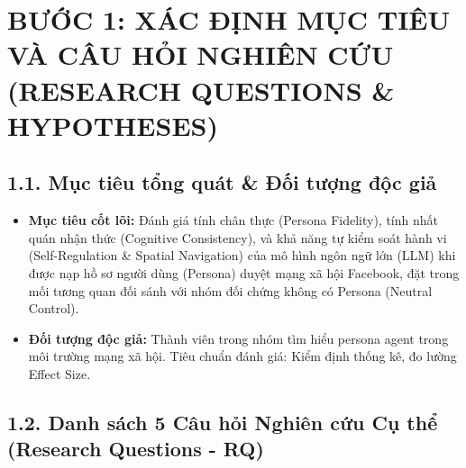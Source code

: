 \documentclass[11pt]{article}
\providecommand{\tightlist}{%
      \setlength{\itemsep}{0pt}\setlength{\parskip}{0pt}}
\begin{document}
    \section{BƯỚC 1: XÁC ĐỊNH MỤC TIÊU VÀ CÂU HỎI NGHIÊN CỨU (RESEARCH
QUESTIONS \&
HYPOTHESES)}\label{bux1b0ux1edbc-1-xuxe1c-ux111ux1ecbnh-mux1ee5c-tiuxeau-vuxe0-cuxe2u-hux1ecfi-nghiuxean-cux1ee9u-research-questions-hypotheses}

\subsection{1.1. Mục tiêu tổng quát \& Đối tượng độc
giả}\label{mux1ee5c-tiuxeau-tux1ed5ng-quuxe1t-ux111ux1ed1i-tux1b0ux1ee3ng-ux111ux1ed9c-giux1ea3}

\begin{itemize}
\tightlist
\item
  \textbf{Mục tiêu cốt lõi:} Đánh giá tính chân thực (Persona Fidelity),
  tính nhất quán nhận thức (Cognitive Consistency), và khả năng tự kiểm
  soát hành vi (Self-Regulation \& Spatial Navigation) của mô hình ngôn
  ngữ lớn (LLM) khi được nạp hồ sơ người dùng (Persona) duyệt mạng xã
  hội Facebook, đặt trong mối tương quan đối sánh với nhóm đối chứng
  không có Persona (Neutral Control).
\item
  \textbf{Đối tượng độc giả:} Thành viên trong nhóm tìm hiểu persona
  agent trong môi trường mạng xã hội. Tiêu chuẩn đánh giá: Kiểm định
  thống kê, đo lường Effect Size.
\end{itemize}

    \subsection{1.2. Danh sách 5 Câu hỏi Nghiên cứu Cụ thể (Research
Questions -
RQ)}\label{danh-suxe1ch-5-cuxe2u-hux1ecfi-nghiuxean-cux1ee9u-cux1ee5-thux1ec3-research-questions---rq}
\end{document}
